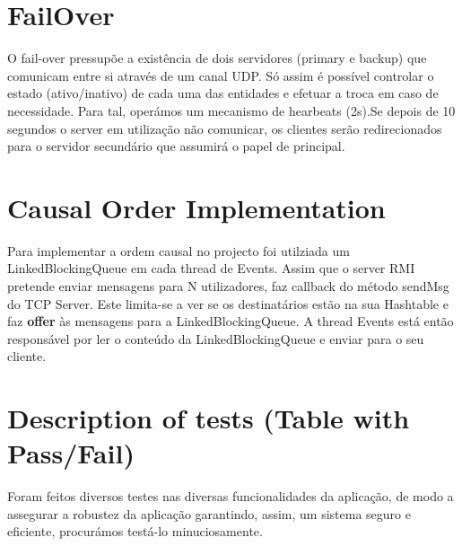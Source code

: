 \documentclass[12pt]{article} %
\begin{document}
\section{FailOver}
\label{sec:failover}
O fail-over pressupõe a existência de dois servidores (primary e backup) que comunicam entre si através de um canal UDP. Só assim é possível controlar o estado (ativo/inativo) de cada uma das entidades e efetuar a troca em caso de necessidade. Para tal, operámos um mecanismo de hearbeats (2s).Se depois de 10 segundos o server em utilização não comunicar, os clientes serão redirecionados para o servidor secundário que assumirá o papel de principal.

\pagebreak
\section{Causal Order Implementation}
\label{sec:causal}

Para implementar a ordem causal no projecto foi utilziada um LinkedBlockingQueue em cada thread de Events. Assim que o server RMI pretende enviar mensagens para N utilizadores, faz callback do método sendMsg do TCP Server. Este limita-se a ver se os destinatários estão na sua Hashtable e faz \textbf{offer} às mensagens para a LinkedBlockingQueue. A thread Events está então responsável por ler o conteúdo da LinkedBlockingQueue e enviar para o seu cliente.

\pagebreak
\section{Description of tests (Table with Pass/Fail)} %
\label{sec:Tests}
Foram feitos diversos testes nas diversas funcionalidades da aplicação, de modo a assegurar a robustez da aplicação garantindo, assim, um sistema seguro e eficiente, procurámos testá-lo minuciosamente.

\end{document}
